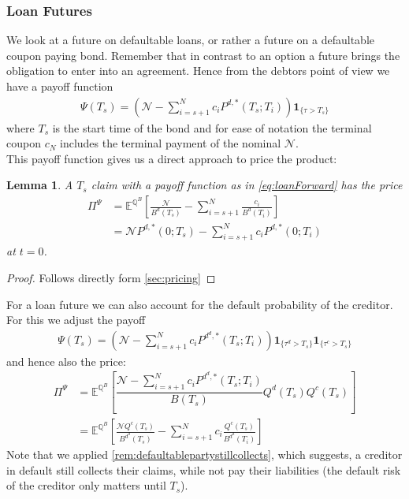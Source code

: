 \documentclass[12pt]{article}
\newtheorem{lemma}[theorem]{Lemma}
\begin{document}
	\subsubsection{Loan Futures}
	We look at a future on defaultable loans, or rather a future on a defaultable coupon paying bond. 
	Remember that in contrast to an option a future brings the obligation to enter into an agreement.
	Hence from the debtors point of view we have a payoff function
	\begin{align}\label{eq:loanForward}
		\Psi(T_s) = \left(\mathcal{N} - \sum_{i=s+1}^{N}c_iP^{d,*}(T_s; T_i)\right)\mathbf{1}_{\{\tau > T_s\}}
	\end{align}
	where $T_s$ is the start time of the bond and for ease of notation the terminal coupon $c_N$ includes the terminal payment of the nominal $\mathcal{N}$.\\
	This payoff function gives us a direct approach to price the product:
	\begin{lemma}\label{lm:simpledefcouponbondforward}
		A $T_s$ claim with a payoff function as in \cref{eq:loanForward} has the price
		\begin{align*}
			\Pi^\Psi &= \mathbb{E}^{\mathbb{Q}^B}\left[\frac{\mathcal{N}}{B^d(T_s)} - \sum_{i=s+1}^{N}\frac{c_i}{B^{d}(T_i)}\right]\\
			&= \mathcal{N}P^{d,*}(0;T_s) - \sum_{i=s+1}^{N}c_iP^{d,*}(0; T_i)
		\end{align*}
		at $t=0$.
	\end{lemma}
	\begin{proof}
		Follows directly form \cref{sec:pricing}
	\end{proof}
	For a loan future we can also account for the default probability of the creditor. For this we adjust the payoff
	\begin{align}\label{eq:loanForwardCreditorDefaultable}
		\Psi(T_s) = \left(\mathcal{N} - \sum_{i=s+1}^{N}c_iP^{d^d,*}(T_s; T_i)\right)\mathbf{1}_{\{\tau^d > T_s\}}\mathbf{1}_{\{\tau^c > T_s\}}
	\end{align}
	and hence also the price:
	\begin{align}\label{eq:pricecbforwardbothdef}
		\Pi^\Psi &= \mathbb{E}^{\mathbb{Q}^B}\left[\dfrac{\mathcal{N} - \sum_{i=s+1}^{N}c_iP^{d^d,*}(T_s; T_i)}{B(T_s)}Q^d(T_s)Q^c(T_s)\right]\\
		&= \mathbb{E}^{\mathbb{Q}^B}\left[\frac{\mathcal{N}Q^c(T_s)}{B^{d^d}(T_s)} - \sum_{i=s+1}^{N}c_i\frac{Q^c(T_s)}{B^{d^d}(T_i)}\right]
	\end{align}
	Note that we applied \cref{rem:defaultablepartystillcollects}, which suggests, a creditor in default still collects their claims, while not pay their liabilities (the default risk of the creditor only matters until $T_s$).\\
\end{document}
